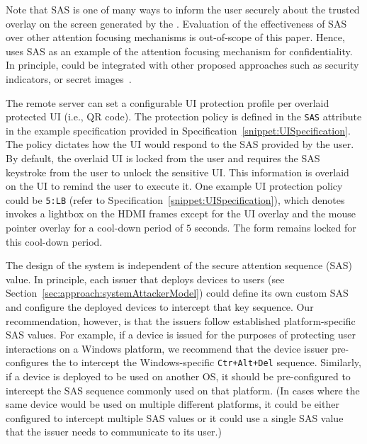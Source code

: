 Note that SAS is one of many ways to inform the user securely about the trusted overlay on the screen generated by the \device. Evaluation of the effectiveness of SAS over other attention focusing mechanisms is out-of-scope of this paper. Hence, \name uses SAS as an example of the attention focusing mechanism for confidentiality. In principle, \name could be integrated with other proposed approaches such as security indicators, or secret images~\cite{6894474,Marforio2016}.

\parasave
{} The remote server can set a configurable UI protection profile per overlaid protected UI (i.e., QR code). The protection policy is defined in the \texttt{SAS} attribute in the example specification provided in Specification~\ref{snippet:UISpecification}. The policy dictates how the UI would respond to the SAS provided by the user. By default, the overlaid UI is locked from the user and requires the SAS keystroke from the user to unlock the sensitive UI. This information is overlaid on the UI to remind the user to execute it. One example UI protection policy could be \texttt{5:LB} (refer to Specification~\ref{snippet:UISpecification}), which denotes \device invokes a lightbox on the HDMI frames except for the UI overlay and the mouse pointer overlay for a cool-down period of $5$ seconds. The form remains locked for this cool-down period.

The design of the \name system is independent of the secure attention sequence (SAS) value. In principle, each issuer that deploys \device devices to users (see Section~\ref{sec:approach:systemAttackerModel}) could define its own custom SAS and configure the deployed \device devices to intercept that key sequence. Our recommendation, however, is that the \device issuers follow established platform-specific SAS values. For example, if a \device device is issued for the purposes of protecting user interactions on a  Windows platform, we recommend that the device issuer pre-configures the \device to intercept the Windows-specific \texttt{Ctr+Alt+Del} sequence. Similarly, if a \device device is deployed to be used on another OS, it should be pre-configured to intercept the SAS sequence commonly used on that platform. (In cases where the same \device device would be used on multiple different platforms, it could be either configured to intercept multiple SAS values or it could use a single SAS value that the issuer needs to communicate to its user.)




